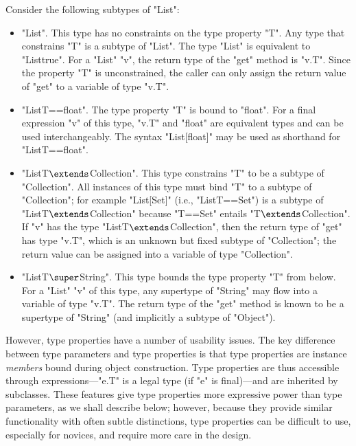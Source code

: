 Consider the following subtypes of \xcd"List":
\begin{itemize}
\item \xcd"List".  This type has no constraints on the type
property \xcd"T".
Any type that constrains \xcd"T"
is a subtype of \xcd"List".  The type \xcd"List" is equivalent to
\xcd"List{true}".
%
For a \xcd"List" \xcd"v", the return type of the \xcd"get" method
is \xcd"v.T".
Since the property \xcd"T" is unconstrained,
the caller can only assign the return value of \xcd"get"
to a variable of type \xcd"v.T".

\item \xcd"List{T==float}".
The type property \xcd"T" is bound to \xcd"float".
For a final expression \xcd"v" of this type,
\xcd"v.T" and \xcd"float" are equivalent types and can be used
interchangeably.
The syntax \xcd"List[float]" may be used as
shorthand for \xcd"List{T==float}".

\item \xcdmath"List{T$\extends$Collection}".
This type constrains \xcd"T" to be a subtype of \xcd"Collection".
All instances of this type must bind \xcd"T" to a subtype of
\xcd"Collection"; for example \xcd"List[Set]" (i.e.,
\xcd"List{T==Set}") is a subtype of
\xcdmath"List{T$\extends$Collection}" because \xcd"T==Set" entails
\xcdmath"T$\extends$Collection".
%
If \xcd"v" has the type \xcdmath"List{T$\extends$Collection}",
then the return type of \xcd"get" has type \xcd"v.T", which is an unknown but
fixed subtype of \xcd"Collection"; the return value can be
assigned into a variable of type \xcd"Collection".

\item \xcdmath"List{T$\super$String}".  This type bounds the type property
\xcd"T"
from below.  For a \xcd"List" \xcd"v" of this type, any
supertype of \xcd"String" may flow into a variable of type \xcd"v.T".
The return type of the \xcd"get"
method is known to be a
supertype of \xcd"String" (and implicitly a subtype of \xcd"Object").
\end{itemize}

However,
type properties have a number of usability issues.
The key difference between type parameters and type properties
is that type properties are
instance \emph{members} bound during object construction.  Type
properties are thus accessible through expressions---\xcd"e.T" is
a legal type (if \xcd"e" is final)---and are inherited by subclasses.
These features give type properties more expressive power than
type parameters, as we shall describe below; however, because they 
provide similar functionality with often subtle distinctions,
type properties can be difficult to use, especially for novices,
and require more care in the design.

